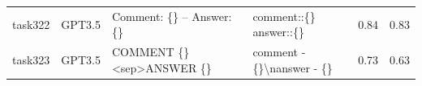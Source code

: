 \begin{longtable}{@{}p{0.8cm\tiny}p{1cm\tiny}p{4.1cm\ttfamily\tiny}p{4.1cm\ttfamily\tiny}p{0.8cm\tiny}p{0.8cm\tiny}@{}}
task322   & GPT3.5    & Comment: \{\} -- Answer: \{\}                                                                                                                                                                                                                                                                                                                                                                                                                                                                                           & comment::\{\}  answer::\{\}                                                                                                                                                                                                                                                                                                                                                                                                                                                                                                                                                       & 0.84 & 0.83 \\
task323   & GPT3.5    & COMMENT \{\} \textless{}sep\textgreater ANSWER \{\}                                                                                                                                                                                                                                                                                                                                                                                                                                                                     & comment - \{\}\textbackslash{}nanswer - \{\}                                                                                                                                                                                                                                                                                                                                                                                                                                                                                                                                      & 0.73 & 0.63 \\

\end{longtable}

